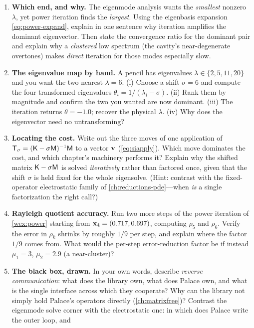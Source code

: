 \exercisessection
\begin{enumerate}[nosep]
  \item \textbf{Which end, and why.} The eigenmode analysis wants the
  \emph{smallest} nonzero $\lambda$, yet power iteration finds the
  \emph{largest}. Using the eigenbasis expansion \cref{eq:power-expand}, explain
  in one sentence why iteration amplifies the dominant eigenvector. Then state the
  convergence ratio for the dominant pair and explain why a \emph{clustered} low
  spectrum (the cavity's near-degenerate overtones) makes \emph{direct} iteration
  for those modes especially slow.
  \item \textbf{The eigenvalue map by hand.} A pencil has eigenvalues
  $\lambda\in\{2,5,11,20\}$ and you want the two nearest $\lambda=6$. (i) Choose a
  shift $\sigma=6$ and compute the four transformed eigenvalues
  $\theta_i=1/(\lambda_i-\sigma)$. (ii) Rank them by magnitude and confirm the two
  you wanted are now dominant. (iii) The iteration returns $\theta=-1.0$; recover
  the physical $\lambda$. (iv) Why does the eigenvector need no untransforming?
  \item \textbf{Locating the cost.} Write out the three moves of one application of
  $\mathsf{T}_\sigma=(\mathsf{K}-\sigma\mathsf{M})^{-1}\mathsf{M}$ to a vector $\mathbf{v}$
  (\cref{eq:siapply}). Which move dominates the cost, and which chapter's machinery
  performs it? Explain why the shifted matrix $\mathsf{K}-\sigma\mathsf{M}$ is solved
  \emph{iteratively} rather than factored once, given that the shift $\sigma$ is
  held fixed for the whole eigensolve. (Hint: contrast with the fixed-operator
  electrostatic family of \cref{ch:reductions-pde}---when \emph{is} a single
  factorization the right call?)
  \item \textbf{Rayleigh quotient accuracy.} Run two more steps of the power
  iteration of \cref{wex:power} starting from $\mathbf{x}_4=(0.717,0.697)$, computing
  $\rho_5$ and $\rho_6$. Verify the error in $\rho_k$ shrinks by roughly $1/9$ per
  step, and explain where the factor $1/9$ comes from. What would the per-step
  error-reduction factor be if instead $\mu_1=3$, $\mu_2=2.9$ (a near-cluster)?
  \item \textbf{The black box, drawn.} In your own words, describe \emph{reverse
  communication}: what does the library own, what does Palace own, and what is the
  single interface across which they cooperate? Why can the library not simply hold
  Palace's operators directly (\cref{ch:matrixfree})? Contrast the eigenmode solve
  corner with the electrostatic one: in which does Palace write the outer loop, and

\end{enumerate}
